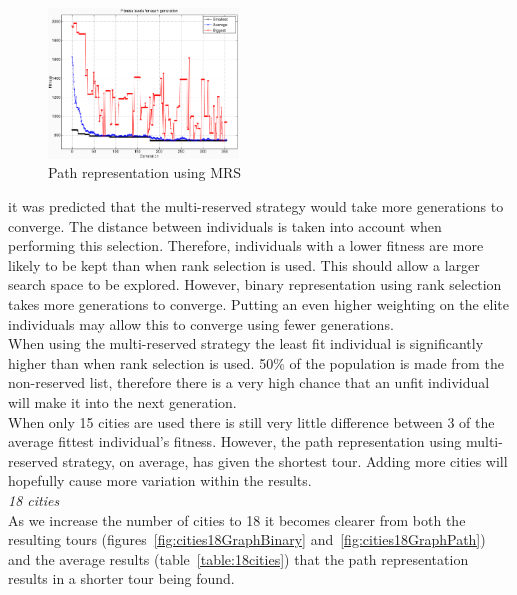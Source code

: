 \documentclass[10pt,a4paper,openbib]{article}
\begin{document}
\begin{multicols}{2}
\begin{figure}[H]
\begin{center}
        \includegraphics[width=0.45\textwidth]{images/result2/GraphPathtrue6.png}
        \caption{Path representation using MRS}
        \label{fig:cities15GraphPathtrue}
\end{center}
\end{figure}

\noindent it was predicted that the multi-reserved strategy would take more generations to converge. The distance between individuals is taken into account when performing this selection. Therefore, individuals with a lower fitness are more likely to be kept than when rank selection is used. This should allow a larger search space to be explored. However, binary representation using rank selection takes more generations to converge. Putting an even higher weighting on the elite individuals may allow this to converge using fewer generations. \\

\noindent When using the multi-reserved strategy the least fit individual is significantly higher than when rank selection is used. 50\% of the population is made from the non-reserved list, therefore there is a very high chance that an unfit individual will make it into the next generation.\\

\noindent When only 15 cities are used there is still very little difference between 3 of the average fittest individual's fitness. However, the path representation using multi-reserved strategy, on average, has given the shortest tour. Adding more cities will hopefully cause more variation within the results.\\

\noindent \textit{18 cities} \\

\noindent As we increase the number of cities to 18 it becomes clearer from both the resulting tours (figures~\ref{fig:cities18GraphBinary} and~\ref{fig:cities18GraphPath}) and the average results (table~\ref{table:18cities}) that the path representation results in a shorter tour being found.


\end{multicols}
\end{document}
